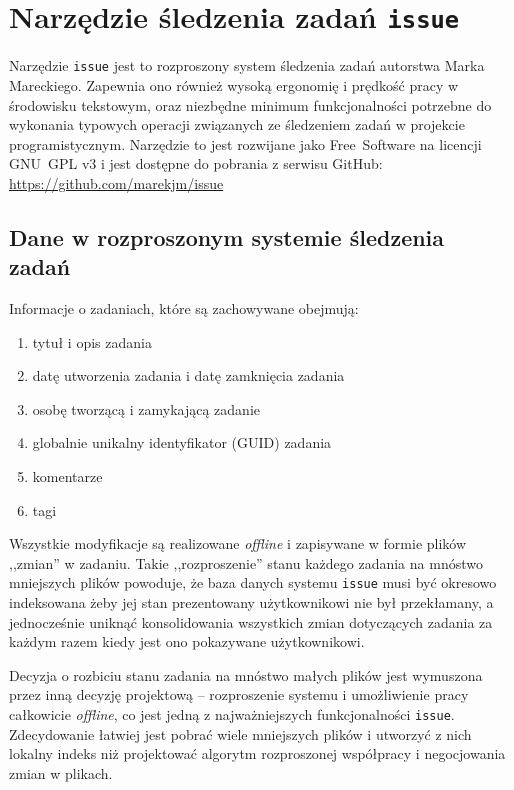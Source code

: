 \chapter{Narzędzie śledzenia zadań \texttt{issue}}
\label{issue_tracking_tool}

Narzędzie \texttt{issue} jest to rozproszony system śledzenia zadań autorstwa
Marka Mareckiego.
Zapewnia ono również wysoką ergonomię i prędkość pracy w środowisku tekstowym,
oraz niezbędne minimum funkcjonalności potrzebne do wykonania typowych operacji
związanych ze śledzeniem zadań w projekcie programistycznym. Narzędzie to jest
rozwijane jako Free~Software na licencji GNU~GPL v3 i jest dostępne do pobrania
z serwisu GitHub: \url{https://github.com/marekjm/issue}

\section{Dane w rozproszonym systemie śledzenia zadań}

Informacje o zadaniach, które są zachowywane obejmują:

\begin{enumerate}
\item tytuł i opis zadania
\item datę utworzenia zadania i datę zamknięcia zadania
\item osobę tworzącą i zamykającą zadanie
\item globalnie unikalny identyfikator (GUID) zadania
\item komentarze
\item tagi
\end{enumerate}

Wszystkie modyfikacje są realizowane \emph{offline} i zapisywane w formie plików
,,zmian'' w zadaniu. Takie ,,rozproszenie'' stanu każdego zadania na mnóstwo
mniejszych plików powoduje, że baza danych systemu \texttt{issue} musi być
okresowo indeksowana żeby jej stan prezentowany użytkownikowi nie był
przekłamany, a jednocześnie uniknąć konsolidowania wszystkich zmian dotyczących
zadania za każdym razem kiedy jest ono pokazywane użytkownikowi.

Decyzja o rozbiciu stanu zadania na mnóstwo małych plików jest wymuszona przez
inną decyzję projektową -- rozproszenie systemu i umożliwienie pracy całkowicie
\emph{offline}, co jest jedną z najważniejszych funkcjonalności \texttt{issue}.
Zdecydowanie łatwiej jest pobrać wiele mniejszych plików i utworzyć z nich
lokalny indeks niż projektować algorytm rozproszonej współpracy i negocjowania
zmian w plikach.

